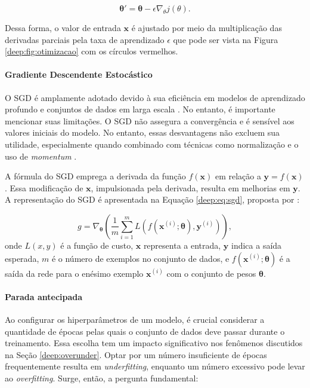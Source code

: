\begin{equation}
    \label{deep:eq:graddesc}
    \boldsymbol{\theta}' = \boldsymbol{\theta} - \epsilon \nabla_{\boldsymbol{}{\theta}} j(\boldsymbol{}{\theta}).
\end{equation}

Dessa forma, o valor de entrada $\boldsymbol{x}$ é ajustado por meio da multiplicação das derivadas parciais pela taxa de aprendizado $\epsilon$ que pode ser vista na Figura \ref{deep:fig:otimizacao} com os círculos vermelhos.

\paragraph{Gradiente Descendente Estocástico}
\label{deep:optimization:sgd}
O SGD é amplamente adotado devido à sua eficiência em modelos de aprendizado profundo e conjuntos de dados em larga escala \citep{Goodfellow2016}. No entanto, é importante mencionar suas limitações. O SGD não assegura a convergência e é sensível aos valores iniciais do modelo. No entanto, essas desvantagens não excluem sua utilidade, especialmente quando combinado com técnicas como normalização e o uso de \textit{momentum} \cite{Goodfellow2016}.

A fórmula do SGD emprega a derivada da função $f(\boldsymbol{x})$ em relação a $\boldsymbol{y} = f(\boldsymbol{x})$. Essa modificação de $\boldsymbol{x}$, impulsionada pela derivada, resulta em melhorias em $\boldsymbol{y}$. A representação do SGD é apresentada na Equação \ref{deep:eq:sgd}, proposta por \cite{Goodfellow2016}:

\begin{equation}
\label{deep:eq:sgd}
g = \nabla_{\boldsymbol{\theta}} \left(\frac{1}{m} \sum\limits_{i=1}^{m}L(f(\boldsymbol{x}^{(i)}; \boldsymbol{\theta}), \mathbf{y}^{(i)})\right),
\end{equation}
onde $L(x,y)$ é a função de custo, $\boldsymbol{x}$ representa a entrada, $\boldsymbol{y}$ indica a saída esperada, $m$ é o número de exemplos no conjunto de dados, e $f(\boldsymbol{x}^{(i)}; \boldsymbol{\theta})$ é a saída da rede para o enésimo exemplo $\boldsymbol{x}^{(i)}$ com o conjunto de pesos $\boldsymbol{\theta}$.

\paragraph{Parada antecipada}
\label{deep:optimization:early_stoping}

Ao configurar os hiperparâmetros de um modelo, é crucial considerar a quantidade de épocas pelas quais o conjunto de dados deve passar durante o treinamento. Essa escolha tem um impacto significativo nos fenômenos discutidos na Seção \ref{deep:overunder}. Optar por um número insuficiente de épocas frequentemente resulta em \textit{underfitting}, enquanto um número excessivo pode levar ao \textit{overfitting}. Surge, então, a pergunta fundamental: 

